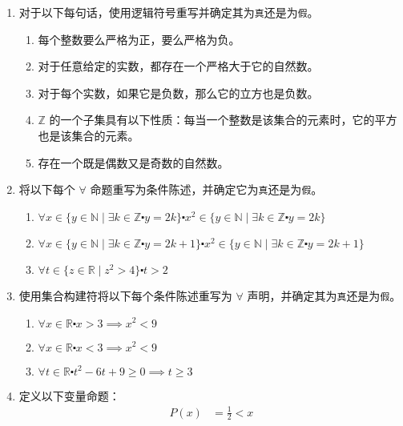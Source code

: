 \begin{enumerate}[label=(\arabic*)]
    \item 对于以下每句话，使用逻辑符号重写并确定其为\verb|真|还是为\verb|假|。
        \begin{enumerate}[label=(\alph*)]
            \item 每个整数要么严格为正，要么严格为负。
            \item 对于任意给定的实数，都存在一个严格大于它的自然数。
            \item 对于每个实数，如果它是负数，那么它的立方也是负数。
            \item $\mathbb{Z}$ 的一个子集具有以下性质：每当一个整数是该集合的元素时，它的平方也是该集合的元素。
            \item 存在一个既是偶数又是奇数的自然数。
        \end{enumerate}
    \item 将以下每个 $\forall$ 命题重写为条件陈述，并确定它为\verb|真|还是为\verb|假|。
        \begin{enumerate}[label=(\alph*)]
            \item $\forall x \in \{y \in \mathbb{N} \mid \exists k \in \mathbb{Z} \centerdot y = 2k\} \centerdot x^2 \in \{y \in \mathbb{N} \mid \exists k \in \mathbb{Z} \centerdot y = 2k\}$
            \item $\forall x \in \{y \in \mathbb{N} \mid \exists k \in \mathbb{Z} \centerdot y = 2k + 1\} \centerdot x^2 \in \{y \in \mathbb{N} \mid \exists k \in \mathbb{Z} \centerdot y = 2k + 1\}$
            \item $\forall t \in \{z \in \mathbb{R} \mid z^2 > 4\} \centerdot t > 2$
        \end{enumerate}
    \item 使用集合构建符将以下每个条件陈述重写为 $\forall$ 声明，并确定其为\verb|真|还是为\verb|假|。
        \begin{enumerate}[label=(\alph*)]
            \item $\forall x \in \mathbb{R} \centerdot x > 3 \implies x^2 < 9$
            \item $\forall x \in \mathbb{R} \centerdot x < 3 \implies x^2 < 9$
            \item $\forall t \in \mathbb{R} \centerdot t^2 - 6t + 9 \ge 0 \implies t \ge 3$
        \end{enumerate}
    \item 定义以下变量命题：
        \begin{align*}
            P(x) &= \frac{1}{2} < x \\

\end{align*}
\end{enumerate}
